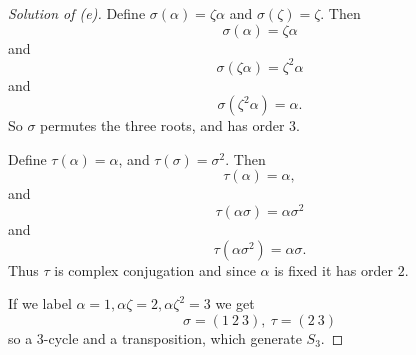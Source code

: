 \begin{proof}[Solution of (e)]
    Define $\sigma(\alpha) = \zeta\alpha$ and 
    $\sigma(\zeta) = \zeta$. Then 
    \[
        \sigma(\alpha) = \zeta\alpha
    \]
    and
    \[
        \sigma(\zeta\alpha) = \zeta^2\alpha
    \]
    and 
    \[
        \sigma(\zeta^2\alpha) = \alpha.
    \]
    So $\sigma$ permutes the three roots, and has 
    order $3$.

    Define $\tau(\alpha) = \alpha$, and 
    $\tau(\sigma) = \sigma^2$.
    Then 
    \[
        \tau(\alpha) = \alpha, 
    \]
    and 
    \[
        \tau(\alpha\sigma) = \alpha\sigma^2
    \]
    and 
    \[
        \tau(\alpha\sigma^2) = \alpha\sigma.
    \]
    Thus $\tau$ is complex conjugation and since $\alpha$ is fixed 
    it has order $2$.

    If we label $\alpha = 1, \alpha\zeta = 2, \alpha\zeta^2 = 3$ 
    we get 
    \[
        \sigma = (1 \ 2 \ 3), \ \tau = (2 \ 3)
    \]
    so a $3$-cycle and a transposition, which generate 
    $S_3$.
\end{proof}

